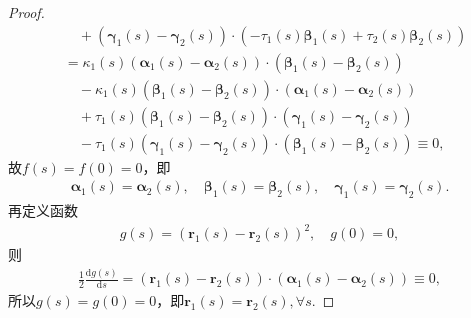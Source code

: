 \documentclass[../../main.tex]{subfiles}%
\begin{document}
\begin{proof}
\begin{align*}
&\quad + (\bm{\gamma}_1(s) - \bm{\gamma}_2(s)) \cdot (-\tau_1(s)\bm{\beta}_1(s) + \tau_2(s)\bm{\beta}_2(s)) \\
&= \kappa_1(s)(\bm{\alpha}_1(s) - \bm{\alpha}_2(s)) \cdot (\bm{\beta}_1(s) - \bm{\beta}_2(s)) \\
&\quad - \kappa_1(s)(\bm{\beta}_1(s) - \bm{\beta}_2(s)) \cdot (\bm{\alpha}_1(s) - \bm{\alpha}_2(s)) \\
&\quad + \tau_1(s)(\bm{\beta}_1(s) - \bm{\beta}_2(s)) \cdot (\bm{\gamma}_1(s) - \bm{\gamma}_2(s)) \\
&\quad - \tau_1(s)(\bm{\gamma}_1(s) - \bm{\gamma}_2(s)) \cdot (\bm{\beta}_1(s) - \bm{\beta}_2(s)) \equiv 0,
\end{align*}
故$f(s) = f(0) = 0$，即
\begin{align}
\bm{\alpha}_1(s) = \bm{\alpha}_2(s),\quad \bm{\beta}_1(s) = \bm{\beta}_2(s),\quad \bm{\gamma}_1(s) = \bm{\gamma}_2(s).
\label{eq:--3ur0jfdjgijiL:LIHFIOAWHFNASawf5.2}
\end{align}
再定义函数
\begin{align}
g(s) = (\bm{r}_1(s) - \bm{r}_2(s))^2,\quad g(0) = 0,
\label{eq:--3ur0jfdjgijiL:LIHFIOAWHFNASawf5.3}
\end{align}
则
\begin{align*}
\frac{1}{2}\frac{\mathrm{d}g(s)}{\mathrm{d}s} = (\bm{r}_1(s) - \bm{r}_2(s)) \cdot (\bm{\alpha}_1(s) - \bm{\alpha}_2(s)) \equiv 0,
\end{align*}
所以$g(s) = g(0) = 0$，即$\bm{r}_1(s) = \bm{r}_2(s),\forall s$.

\end{proof}
\end{document}
